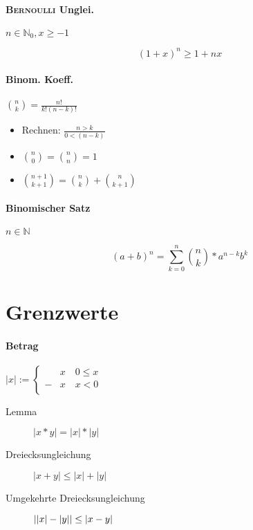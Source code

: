 \paragraph{\textsc{Bernoulli} Unglei.} $n \in \mathbb{N}_0, x \geq -1$

$$(1 + x)^n \geq 1 + nx$$

\paragraph{Binom. Koeff.} $\binom{n}{k} = \frac{n!}{k! (n - k)!}$

\begin{itemize}
      \item Rechnen: $\frac{n > k}{0 < (n - k)}$

      \item $\binom{n}{0} = \binom{n}{n} = 1$

      \item $\binom{n + 1}{k + 1} = \binom{n}{k} + \binom{n}{k + 1}$
\end{itemize}

\paragraph{Binomischer Satz} $n \in \mathbb{N}$

$$(a + b)^n = \sum_{k=0}^n \binom{n}{k} * a^{n - k} b^k$$

\section{Grenzwerte}

\paragraph{Betrag} $|x| := \begin{cases}
              & x \quad 0 \leq x \\
            - & x \quad x < 0    \\
      \end{cases}$

\begin{description}
      \item [Lemma] $|x * y| = |x| * |y|$

      \item [Dreiecksungleichung]
            $|x + y| \boldsymbol{\leq} |x| + |y|$

      \item [Umgekehrte \linebreak Dreiecksungleichung]
            $\linebreak ||x| - |y|| \leq |x - y|$
\end{description}

